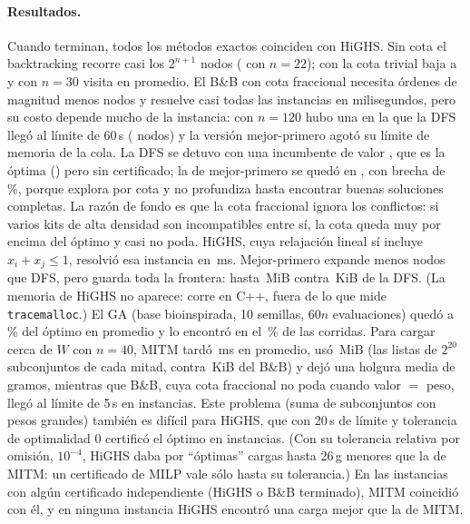 \documentclass[11pt]{article}
\theoremstyle{remark}
\begin{document}
\paragraph{Resultados.} Cuando terminan, todos los métodos exactos coinciden con HiGHS. Sin cota el
backtracking recorre casi los $2^{n+1}$ nodos (\btSinNCC{} con $n=22$); con la cota trivial baja a
\btConNCC{} y con $n=30$ visita \btConNDA{} en promedio. El B\&B con cota fraccional necesita órdenes de
magnitud menos nodos y resuelve casi todas las instancias en milisegundos, pero su costo depende mucho
de la instancia: con $n=120$ hubo una en la que la DFS llegó al límite de 60\,s (\bnbDfsMaxNodos{}
nodos) y la versión mejor-primero agotó su límite de memoria de la cola. La DFS se detuvo con una
incumbente de valor \bnbDfsHardVal, que es la óptima (\bnbHardOpt) pero sin certificado; la de
mejor-primero se quedó en \bnbBestHardVal, con brecha de \bnbBestHardGap\,\%, porque explora por cota y
no profundiza hasta encontrar buenas soluciones completas. La razón de fondo es que la cota fraccional
ignora los conflictos: si
varios kits de alta densidad son incompatibles entre sí, la cota queda muy por encima del óptimo y casi
no poda. HiGHS, cuya relajación lineal sí incluye $x_i+x_j\le1$, resolvió esa instancia en
\milpKnapT\,ms. Mejor-primero expande menos nodos que DFS, pero guarda toda la frontera: hasta
\bnbBestMemMax\,MiB contra \bnbDfsMem\,KiB de la DFS. (La memoria de HiGHS no aparece: corre en C++,
fuera de lo que mide \texttt{tracemalloc}.) El GA (base bioinspirada, 10 semillas, $60n$
evaluaciones) quedó a \gaGap\,\% del óptimo en promedio y lo encontró en el \gaOpt\,\% de las corridas. Para cargar cerca de $W$ con $n=40$, MITM tardó \mitmT\,ms en promedio, usó \mitmMem\,MiB (las listas de
$2^{20}$ subconjuntos de cada mitad, contra \mitmBnbMem\,KiB del B\&B) y dejó una holgura media de
\mitmHolg{} gramos, mientras que B\&B, cuya cota fraccional no poda cuando valor $=$ peso, llegó al
límite de 5\,s en \mitmLim{} instancias. Este problema (suma de subconjuntos con pesos grandes) también
es difícil para HiGHS, que con 20\,s de límite y tolerancia de optimalidad 0 certificó el óptimo en
\mitmMilpCert{} instancias. (Con su tolerancia relativa por omisión, $10^{-4}$, HiGHS daba por
``óptimas'' cargas hasta 26\,g menores que la de MITM: un certificado de MILP vale sólo hasta su
tolerancia.) En
las \mitmVerif{} instancias con algún certificado independiente (HiGHS o B\&B terminado), MITM
coincidió con él, y en ninguna instancia HiGHS encontró una carga mejor que la de MITM.
\end{document}
